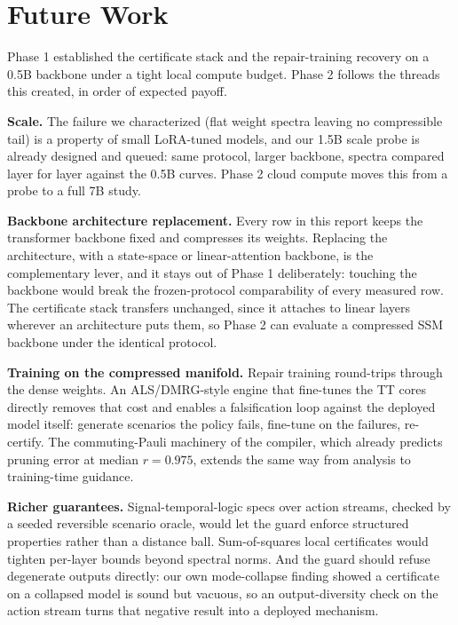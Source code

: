 \documentclass[conference,10pt]{IEEEtran}
\begin{document}
\section{Future Work}

Phase 1 established the certificate stack and the repair-training recovery
on a 0.5B backbone under a tight local compute budget. Phase 2 follows the
threads this created, in order of expected payoff.

\textbf{Scale.} The failure we characterized (flat weight spectra leaving
no compressible tail) is a property of small LoRA-tuned models, and our
1.5B scale probe is already designed and queued: same protocol, larger
backbone, spectra compared layer for layer against the 0.5B curves. Phase 2
cloud compute moves this from a probe to a full 7B study.

\textbf{Backbone architecture replacement.} Every row in this report keeps
the transformer backbone fixed and compresses its weights. Replacing the
architecture, with a state-space or linear-attention backbone, is the
complementary lever, and it stays out of Phase 1 deliberately: touching the
backbone would break the frozen-protocol comparability of every measured
row. The certificate stack transfers unchanged, since it attaches to linear
layers wherever an architecture puts them, so Phase 2 can evaluate a
compressed SSM backbone under the identical protocol.

\textbf{Training on the compressed manifold.} Repair training round-trips
through the dense weights. An ALS/DMRG-style engine that fine-tunes the TT
cores directly removes that cost and enables a falsification loop against
the deployed model itself: generate scenarios the policy fails, fine-tune
on the failures, re-certify. The commuting-Pauli machinery of the compiler,
which already predicts pruning error at median $r = 0.975$, extends the
same way from analysis to training-time guidance.

\textbf{Richer guarantees.} Signal-temporal-logic specs over action
streams, checked by a seeded reversible scenario oracle, would let the
guard enforce structured properties rather than a distance ball.
Sum-of-squares local certificates would tighten per-layer bounds beyond
spectral norms. And the guard should refuse degenerate outputs directly:
our own mode-collapse finding showed a certificate on a collapsed model is
sound but vacuous, so an output-diversity check on the action stream turns
that negative result into a deployed mechanism.
\end{document}
